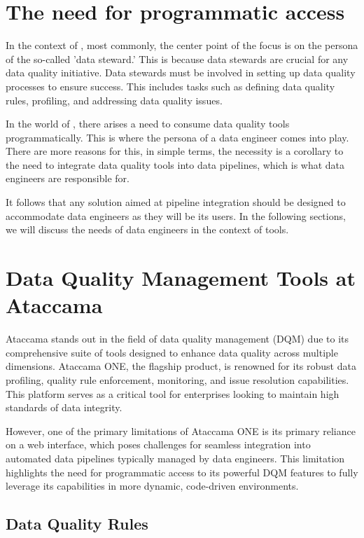 \section*{The need for programmatic access}

In the context of , most commonly, the center point of the focus is on the persona of the so-called 'data steward.' \cite{data_stewards} This is because data stewards are crucial
for any data quality initiative. Data stewards must be involved in setting up data quality processes to ensure success. This includes tasks such as defining data quality rules,
profiling, and addressing data quality issues. 

In the world of , there arises a need to consume data quality tools programmatically. This is where the persona of a data engineer comes into play. There are more reasons for this, in simple terms,
the necessity is a corollary to the need to integrate data quality tools into data pipelines, which is what data engineers are responsible for.

 It follows that any solution aimed at pipeline integration should be designed to accommodate data engineers as they will be its users. In the following sections, we will discuss the needs of data engineers in the context of  tools.

 \section*{Data Quality Management Tools at Ataccama}

 Ataccama stands out in the field of data quality management (DQM) due to its comprehensive suite of tools designed to enhance data quality across multiple dimensions. Ataccama ONE, the flagship product, is renowned for its robust data profiling, quality rule enforcement, monitoring, and issue resolution capabilities. This platform serves as a critical tool for enterprises looking to maintain high standards of data integrity.
 
 However, one of the primary limitations of Ataccama ONE is its primary reliance on a web interface, which poses challenges for seamless integration into automated data pipelines typically managed by data engineers. This limitation highlights the need for programmatic access to its powerful DQM features to fully leverage its capabilities in more dynamic, code-driven environments.
 
 \subsection*{Data Quality Rules}
 
